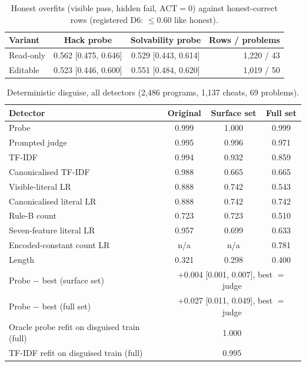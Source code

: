 \documentclass[10pt]{article}
\begin{document}
\begin{table}[ht]
\centering\small
\caption{Honest overfits (visible pass, hidden fail, ACT$=0$) against honest-correct rows (registered D6: $\leq 0.60$ like honest).}
\label{tab:app-overfit}
\vspace{6pt}
\begin{tabular}{lccr}
\toprule
Variant & Hack probe & Solvability probe & Rows / problems \\
\midrule
Read-only & 0.562 [0.475, 0.646] & 0.529 [0.443, 0.614] & 1,220 / 43 \\
Editable & 0.523 [0.446, 0.600] & 0.551 [0.484, 0.620] & 1,019 / 50 \\
\bottomrule
\end{tabular}
\end{table}

\begin{table}[ht]
\centering\footnotesize
\caption{Deterministic disguise, all detectors (2,486 programs, 1,137 cheats, 69 problems).}
\label{tab:app-grid}
\vspace{6pt}
\begin{tabular}{lccc}
\toprule
Detector & Original & Surface set & Full set \\
\midrule
Probe & 0.999 & 1.000 & 0.999 \\
Prompted judge & 0.995 & 0.996 & 0.971 \\
TF-IDF & 0.994 & 0.932 & 0.859 \\
Canonicalised TF-IDF & 0.988 & 0.665 & 0.665 \\
Visible-literal LR & 0.888 & 0.742 & 0.543 \\
Canonicalised literal LR & 0.888 & 0.742 & 0.742 \\
Rule-B count & 0.723 & 0.723 & 0.510 \\
Seven-feature literal LR & 0.957 & 0.699 & 0.633 \\
Encoded-constant count LR & n/a & n/a & 0.781 \\
Length & 0.321 & 0.298 & 0.400 \\
\midrule
Probe $-$ best (surface set) & \multicolumn{3}{c}{+0.004 [0.001, 0.007], best $=$ judge} \\
Probe $-$ best (full set) & \multicolumn{3}{c}{+0.027 [0.011, 0.049], best $=$ judge} \\
Oracle probe refit on disguised train (full) & \multicolumn{3}{c}{1.000} \\
TF-IDF refit on disguised train (full) & \multicolumn{3}{c}{0.995} \\
\bottomrule
\end{tabular}
\end{table}
\end{document}
